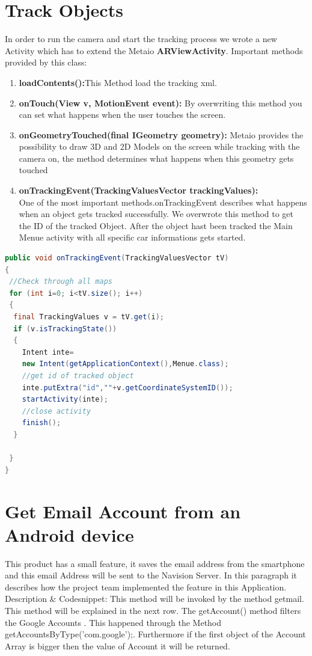 \section{Track Objects}
In order to run the camera and start the tracking process we wrote a new Activity which has to extend the Metaio \textbf{ARViewActivity}. Important methods provided by this class:
\begin{enumerate}
\item \textbf{loadContents():}This Method load the tracking xml.
\item \textbf{onTouch(View v, MotionEvent event):} By overwriting this method you can set what happens when the user touches the screen. 

\item \textbf{onGeometryTouched(final IGeometry geometry):} Metaio provides the possibility to draw 3D and 2D Models on the screen while tracking with the camera on, the method determines what happens when this geometry gets touched 

\item \textbf{onTrackingEvent(TrackingValuesVector trackingValues):} 
\\
One of the most important methods.onTrackingEvent describes what happens when an object gets tracked successfully. We overwrote this method to get the ID of the tracked Object. After the object hast been tracked the Main Menue activity with all specific car informations gets started.   
\end{enumerate} 
\begin{lstlisting}[language=java, caption=Tracking Event]
public void onTrackingEvent(TrackingValuesVector tV)
{
 //Check through all maps 
 for (int i=0; i<tV.size(); i++)
 {
  final TrackingValues v = tV.get(i);
  if (v.isTrackingState())
  {
	Intent inte=
	new Intent(getApplicationContext(),Menue.class);
	//get id of tracked object
	inte.putExtra("id",""+v.getCoordinateSystemID());
	startActivity(inte);
	//close activity
	finish();
  }
				
 }
}
\end{lstlisting}
\section{Get Email Account from an Android device}
This product has  a small feature, it saves the email address from the smartphone and this email Address will be sent to the Navision Server. In this paragraph it describes how the project team implemented the feature in this Application.
Description \& Codesnippet:
This method will be invoked by the method getmail. This method will be explained in the next row. The getAccount() method  filters the Google Accounts . This happened through the Method getAccountsByType('com.google');.
Furthermore if the first object of the Account Array is bigger then the value of Account  it will be returned.


